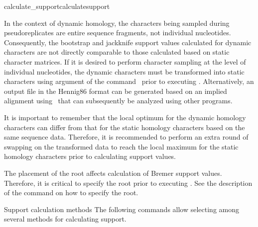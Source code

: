 \begin{command}{calculate\_support}{calculatesupport}
                   \begin{statement}
                   \setlength{\parindent}{0.5cm}
                In the context of dynamic
                homology, the characters being sampled during pseudoreplicates
                are entire sequence fragments, not individual nucleotides.
                Consequently, the bootstrap and jackknife support values
                calculated for dynamic characters are not directly comparable to
                those calculated based on static character matrices. If it is
                desired to perform character sampling at the level of
                individual nucleotides, the dynamic characters must be
                transformed into static characters using 
                argument of the command~
                prior to executing .
                Alternatively, an output file in the Hennig86 format can be
                generated based on an implied alignment
                using~ that can subsequently be analyzed
                using other programs.
                                
                \indent It is important to remember that the local optimum for the dynamic
                homology characters can differ from that for the static homology characters
                based on the same sequence data. Therefore, it is recommended to perform 
                an extra round of swapping on the transformed data to reach the local 
                maximum for the static homology characters prior to calculating support values.
            \end{statement}
          
      \begin{statement}
  	  The placement of the root affects calculation of Bremer support values.
	  Therefore, it is critical to specify the root prior to executing
	  . See the description of the
	  command  on how to specify the root.
	\end{statement}          
                       
        
              
	\begin{arguments}
		\begin{argumentgroup}{Support calculation methods}
            {The following commands allow selecting among several methods for
            calculating support.} 


\end{argumentgroup}
\end{arguments}
\end{command}
